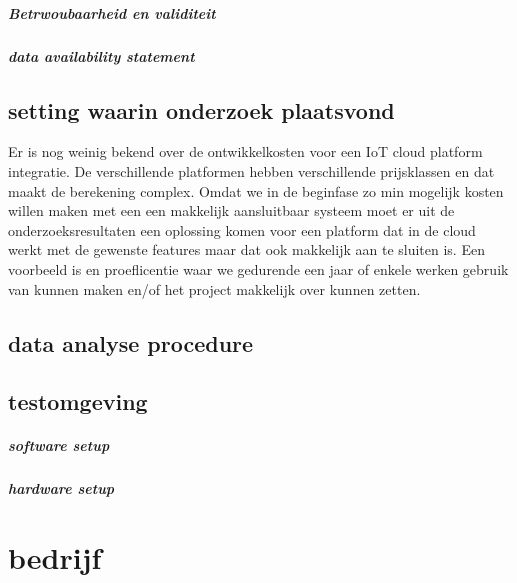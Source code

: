 \paragraph{Betrwoubaarheid en validiteit}

\paragraph{data availability statement}

\section{setting waarin onderzoek plaatsvond}
Er is nog weinig bekend over de ontwikkelkosten voor een IoT cloud platform integratie. De verschillende platformen hebben verschillende prijsklassen en dat maakt de berekening complex. Omdat we in de beginfase zo min mogelijk kosten willen maken met een een makkelijk aansluitbaar systeem moet er uit de onderzoeksresultaten een oplossing komen voor een platform dat in de cloud werkt met de gewenste features maar dat ook makkelijk aan te sluiten is. Een voorbeeld is en proeflicentie waar we gedurende een jaar of enkele werken gebruik van kunnen maken en/of het project makkelijk over kunnen zetten.

\section{data analyse procedure}

\section{testomgeving}

\paragraph{software setup}



\paragraph{hardware setup}






\chapter{bedrijf}

